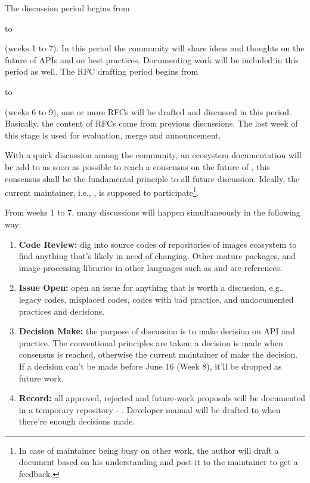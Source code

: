The discussion period begins from \date{April 22} to \date{June 9} (weeks 1 to 7). In this period the community will share ideas and thoughts on the future of APIs and on best practices. Documenting work will be included in this period as well. The RFC drafting period begins from \date{May 27} to \date{June 23} (weeks 6 to 9), one or more RFCs will be drafted and discussed in this period. Basically, the content of RFCs come from previous discussions. The last week of this stage is used for evaluation, merge and announcement.\par

With a quick discussion among the community, an ecosystem documentation will be add to \repoimagesgithubio{} as soon as possible to reach a consensus on the future of \images{}, this consensus shall be the fundamental principle to all future discussion. Ideally, the current \images{} maintainer, i.e., \timholy, is supposed to participate\footnote{In case of maintainer being busy on other work, the author will draft a document based on his understanding and post it to the maintainer to get a feedback.}.\par

From weeks 1 to 7, many discussions will happen simultaneously in the following way:
\begin{enumerate}
    \item \textbf{Code Review:} dig into source codes of repositories of images ecosystem to find anything that's likely in need of changing. Other mature \langjulia{} packages, and image-processing libraries in other languages such as \reposcikitimage{} and \matlabimageprocessing{} are references.
    \item \textbf{Issue Open:} open an issue for anything that is worth a discussion, e.g., legacy codes, misplaced codes, codes with bad practice, and undocumented practices and decisions.
    \item \textbf{Decision Make:} the purpose of discussion is to make decision on API and practice. The conventional principles are taken: a decision is made when consensus is reached, otherwise the current maintainer of \images{} make the decision. If a decision can't be made before June 16 (Week 8), it'll be dropped as future work.
    \item \textbf{Record:} all approved, rejected and future-work proposals will be documented in a temporary repository - \repogsoctempdoc{}. Developer manual will be drafted to \repoimagesgithubio{} when there're enough decisions made.
\end{enumerate}

